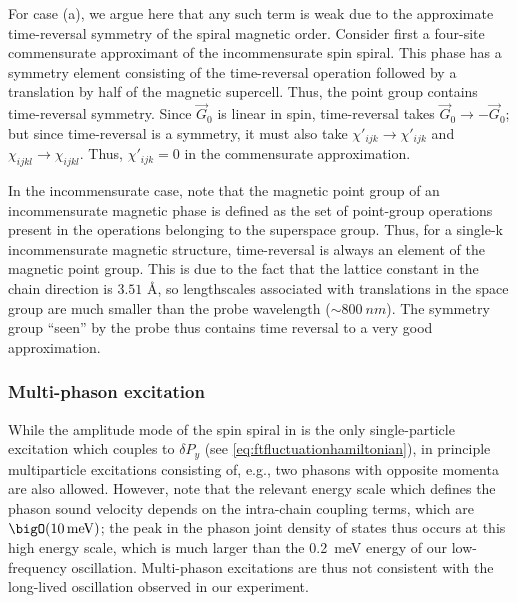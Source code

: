 For case (a), we argue here that any such term is weak due to the approximate time-reversal symmetry of the spiral magnetic order.
Consider first a four-site commensurate approximant of the incommensurate spin spiral.
This phase has a symmetry element consisting of the time-reversal operation followed by a translation by half of the magnetic supercell.
Thus, the point group contains time-reversal symmetry.
Since $\vec{G}_0$ is linear in spin, time-reversal takes $\vec{G}_0\rightarrow-\vec{G}_0$; but since time-reversal is a symmetry, it must also take $\chi'_{ijk}\rightarrow\chi'_{ijk}$ and $\chi_{ijkl}\rightarrow\chi_{ijkl}$.
Thus, $\chi'_{ijk}=0$ in the commensurate approximation.

In the incommensurate case, note that the magnetic point group of an incommensurate magnetic phase is defined as the set of point-group operations present in the operations belonging to the superspace group.
Thus, for a single-k incommensurate magnetic structure, time-reversal is always an element of the magnetic point group.
This is due to the fact that the lattice constant in the chain direction is $3.51$ \si{\angstrom}, so lengthscales associated with translations in the space group are much smaller than the probe wavelength ($\sim\qty{800}{nm}$).
The symmetry group ``seen'' by the probe thus contains time reversal to a very good approximation.

\subsubsection{Multi-phason excitation}

While the amplitude mode of the spin spiral in  is the only single-particle excitation which couples to $\delta P_y$ (see \cref{eq:ftfluctuationhamiltonian}), in principle multiparticle excitations consisting of, e.g., two phasons with opposite momenta are also allowed.
However, note that the relevant energy scale which defines the phason sound velocity depends on the intra-chain coupling terms, which are $\bigO(\qty{10}{meV})$; the peak in the phason joint density of states thus occurs at this high energy scale, which is much larger than the \qty{0.2}{meV} energy of our low-frequency oscillation.
Multi-phason excitations are thus not consistent with the long-lived oscillation observed in our experiment.
